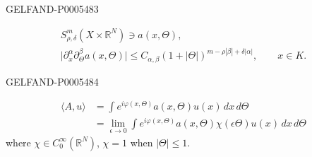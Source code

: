 \begin{GelfandAdjacentEvidence}{GELFAND-P000548}{3}

\begin{gather*}
S_{\rho,\delta}^m(X\times\mathbb R^N)\ni a(x,\Theta),\\
\bigl|\partial_x^\alpha\partial_\Theta^\beta a(x,\Theta)\bigr|
\le C_{\alpha,\beta}(1+|\Theta|)^{m-\rho|\beta|+\delta|\alpha|},
\qquad x\in K.
\end{gather*}
\end{GelfandAdjacentEvidence}
\begin{GelfandAdjacentEvidence}{GELFAND-P000548}{4}

\begin{align*}
\langle A,u\rangle&=\int e^{i\varphi(x,\Theta)}a(x,\Theta)u(x)\,dx\,d\Theta\\
&=\lim_{\epsilon\to0}\int e^{i\varphi(x,\Theta)}
a(x,\Theta)\chi(\epsilon\Theta)u(x)\,dx\,d\Theta
\end{align*}
where \(\chi\in C_0^\infty(\mathbb R^N)\), \(\chi=1\) when \(|\Theta|\le1\).
\end{GelfandAdjacentEvidence}



